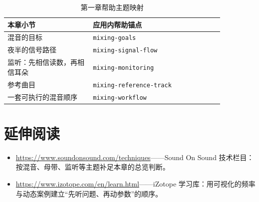 \begin{table}[htbp]
\centering
\small
\begin{tabular}{@{}p{0.34\linewidth}p{0.52\linewidth}@{}}
\hline
本章小节 & 应用内帮助锚点 \\
\hline
混音的目标 & \texttt{mixing-goals} \\
夜半的信号路径 & \texttt{mixing-signal-flow} \\
监听：先相信读数，再相信耳朵 & \texttt{mixing-monitoring} \\
参考曲目 & \texttt{mixing-reference-track} \\
一套可执行的混音顺序 & \texttt{mixing-workflow} \\
\hline
\end{tabular}
\caption{第一章帮助主题映射}
\end{table}

\section*{延伸阅读}
\begin{itemize}[leftmargin=1.5em]
\item \url{https://www.soundonsound.com/techniques}——Sound On Sound 技术栏目：按混音、母带、监听等主题补足本章的总览判断。
\item \url{https://www.izotope.com/en/learn.html}——iZotope 学习库：用可视化的频率与动态案例建立“先听问题、再动参数”的顺序。
\end{itemize}
